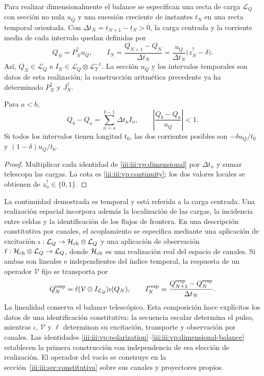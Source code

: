 Para realizar dimensionalmente el balance se especifican una recta de carga
$\mathcal L_Q$ con sección no nula $u_Q$ y una sucesión creciente de
instantes $t_N$ en una recta temporal orientada. Con
$\Delta t_N=t_{N+1}-t_N>0$, la carga centrada y la corriente media de
cada intervalo quedan definidas por
\begin{equation}
 Q_N=P_N^{\uparrow}u_Q,\qquad
 I_N=\frac{Q_{N+1}-Q_N}{\Delta t_N}
     =\frac{u_Q}{\Delta t_N}\bigl(z_N^{\uparrow}-\delta\bigr).
 \label{iii:iii:vp:dimensional}
\end{equation}
Así, $Q_N\in\mathcal L_Q$ e
$I_N\in\mathcal L_Q\otimes\mathcal L_T^{-1}$. La sección $u_Q$ y
los intervalos temporales son datos de esta realización; la construcción
aritmética precedente ya ha determinado $P_N^{\uparrow}$ y
$J_N^{\uparrow}$.

\begin{proposition}
Para $a<b$,
\begin{equation}
 Q_b-Q_a=\sum_{n=a}^{b-1}\Delta t_n I_n,
 \qquad
 \left|\frac{Q_b-Q_a}{u_Q}\right|<1.
 \label{iii:iii:vp:dimensional-balance}
\end{equation}
Si todos los intervalos tienen longitud $t_0$, las dos corrientes posibles
son $-\delta u_Q/t_0$ y $(1-\delta)u_Q/t_0$.
\end{proposition}
\begin{proof}
Multiplicar cada identidad de \eqref{iii:iii:vp:dimensional} por
$\Delta t_n$ y sumar telescopa las cargas. La cota es
\eqref{iii:iii:vp:continuity}; los dos valores locales se obtienen de
$z_n^{\uparrow}\in\{0,1\}$.
\end{proof}

La continuidad demostrada es temporal y está referida a la carga centrada.
Una realización espacial incorpora además la localización de las cargas,
la incidencia entre celdas y la identificación de los flujos de frontera.
En una descripción constitutiva por canales, el acoplamiento se especifica
mediante una aplicación de excitación
$\iota:\mathcal L_Q\to\mathcal H_{\rm ch}\otimes\mathcal L_Q$
y una aplicación de observación
$\ell:\mathcal H_{\rm ch}\otimes\mathcal L_Q\to\mathcal L_Q$,
donde $\mathcal H_{\rm ch}$ es una realización real del espacio de canales.
Si ambas son
lineales e independientes del índice temporal, la respuesta de un operador
$\mathcal V$ fijo se transporta por
\[
 Q_N^{\rm resp}=\ell(\mathcal V\otimes I_{\mathcal L_Q})\iota(Q_N),
 \qquad
 I_N^{\rm resp}=\frac{Q_{N+1}^{\rm resp}-Q_N^{\rm resp}}{\Delta t_N}.
\]
La linealidad conserva el balance telescópico. Esta composición hace
explícitos los datos de una identificación constitutiva: la secuencia
escalar determina el pulso, mientras $\iota$, $\mathcal V$ y $\ell$
determinan su excitación, transporte y observación por canales. Las
identidades \eqref{iii:iii:vp:polarization}--\eqref{iii:iii:vp:dimensional-balance}
establecen la primera construcción con independencia de esa elección de
realización. El operador del vacío se construye en la
sección~\ref{iii:iii:sec:constitutiva} sobre sus canales y proyectores propios.

